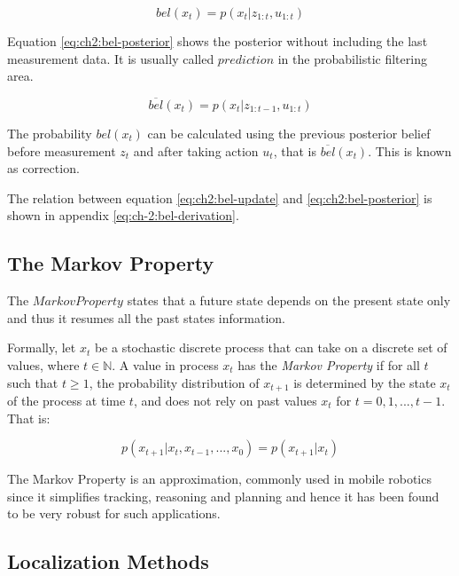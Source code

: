 \begin{equation}
bel(x_t) = p(x_t | z_{1:t}, u_{1:t})
\label{eq:ch2:bel-update}
\end{equation}

Equation \ref{eq:ch2:bel-posterior} shows the posterior without including the last measurement data. It is usually called $prediction$ in the probabilistic filtering area.

\begin{equation}
\overline{bel}(x_t) = p(x_t | z_{1:t-1}, u_{1:t})
\label{eq:ch2:bel-posterior}
\end{equation}

The probability $bel(x_t)$ can be calculated using the previous posterior belief before measurement $z_t$ and after taking action $u_t$, that is $\overline{bel}(x_t)$. This is known as correction\cite{Thrun:robotic-statistics}. 

The relation between equation \ref{eq:ch2:bel-update} and \ref{eq:ch2:bel-posterior} is shown in appendix \ref{eq:ch-2:bel-derivation}.

\subsection{The Markov Property}

The $Markov Property$ states that a future state depends on the present state only and thus it resumes all the past states information.

Formally, let $x_t$ be a stochastic discrete process that can take on a discrete set of values, where $t \in \mathbb{N}$. A value in process $x_t$ has the \textit{Markov Property} if for all $t$ such that $t\geq1$, the probability distribution of $x_{t+1}$ is determined by the state $x_t$ of the process at time $t$, and does not rely on past values $x_t$ for $t = 0, 1, ..., t - 1$\cite{Privault:markov-chains}. That is:

\begin{equation}
p(x_{t+1} | x_t, x_{t-1}, ..., x_0) = p(x_{t+1} | x_t)
\end{equation}

The Markov Property is an approximation, commonly used in mobile robotics since it simplifies tracking, reasoning and planning and hence it has been found to be very robust for such applications\cite{Siegwart:intro-autonumous-robots}. 


\subsection{Localization Methods}

